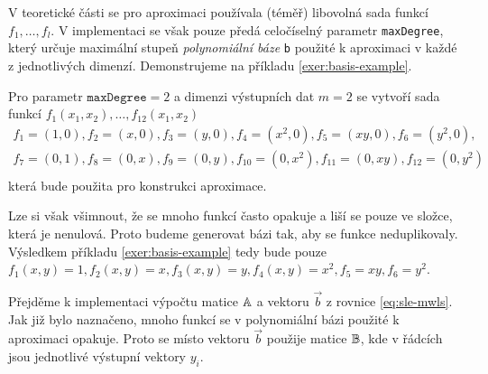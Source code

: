 V teoretické části se pro aproximaci používala (téměř) libovolná sada funkcí $f_1, \ldots, f_l$. V implementaci se však pouze předá celočíselný parametr \texttt{maxDegree}, který určuje maximální stupeň \textit{polynomiální báze} \texttt{b} použité k aproximaci v každé z jednotlivých dimenzí. Demonstrujeme na příkladu \ref{exer:basis-example}.
\begin{priklad}
  \label{exer:basis-example}
  Pro parametr $\texttt{maxDegree} = 2$ a dimenzi výstupních dat $m = 2$ se vytvoří sada funkcí $f_1(x_1, x_2), \ldots, f_{12}(x_1, x_2)$
  \begin{multline}
    f_1 = (1, 0), f_2 = (x, 0), f_3 = (y, 0), f_4 = (x^2, 0), f_5 = (xy, 0), f_6 = (y^2, 0),\\
    f_7 = (0, 1), f_8 = (0, x), f_9 = (0, y), f_{10} = (0, x^2), f_{11} = (0, xy), f_{12} = (0, y^2)\\
  \end{multline}
  která bude použita pro konstrukci aproximace.
\end{priklad}
Lze si však všimnout, že se mnoho funkcí často opakuje a liší se pouze ve složce, která je nenulová. Proto budeme generovat bázi tak, aby se funkce neduplikovaly. Výsledkem příkladu \ref{exer:basis-example} tedy bude pouze $f_1(x, y) = 1, f_2(x, y) = x, f_3(x,y) = y, f_4(x,y)=x^2,f_5=xy,f_6=y^2$.

Přejděme k implementaci výpočtu matice $\mathbb{A}$ a vektoru $\vec{b}$ z rovnice \ref{eq:sle-mwls}. Jak již bylo naznačeno, mnoho funkcí se v polynomiální bázi použité k aproximaci opakuje. Proto se místo vektoru $\vec{b}$ použije matice $\mathbb{B}$, kde v řádcích jsou jednotlivé výstupní vektory $y_i$.

